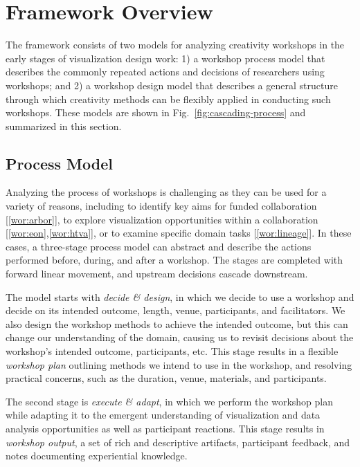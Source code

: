 \section{Framework Overview}
\label{sec:overview}

The framework consists of two models for analyzing creativity workshops in the early stages of visualization design work: 1) a workshop process model that describes the commonly repeated actions and decisions of researchers using workshops; and 2) a workshop design model that describes a general structure through which creativity methods can be flexibly applied in conducting such workshops. These models are shown in Fig.~\ref{fig:cascading-process} and summarized in this section.

\subsection{Process Model}

Analyzing the process of workshops is challenging as they can be used for a variety of reasons, including to identify key aims for funded collaboration [\ref{wor:arbor}], to explore visualization opportunities within a collaboration [\ref{wor:eon},\ref{wor:htva}], or to examine specific domain tasks [\ref{wor:lineage}]. In these cases, a three-stage process model can abstract and describe the actions performed before, during, and after a workshop. The stages are completed with forward linear movement, and upstream decisions cascade downstream.

The model starts with \emph{decide \& design}, in which we decide to use a workshop and decide on its intended outcome, length, venue, participants, and facilitators. We also design the workshop methods to achieve the intended outcome, but this can change our understanding of the domain, causing us to revisit decisions about the workshop's intended outcome, participants, etc. This stage results in a flexible \emph{workshop plan} outlining methods we intend to use in the workshop, and resolving practical concerns, such as the duration, venue, materials, and participants.

The second stage is \emph{execute \& adapt}, in which we perform the workshop plan while adapting it to the emergent understanding of visualization and data analysis opportunities as well as participant reactions. This stage results in \emph{workshop output}, a set of rich and descriptive artifacts, participant feedback, and notes documenting experiential knowledge. 


